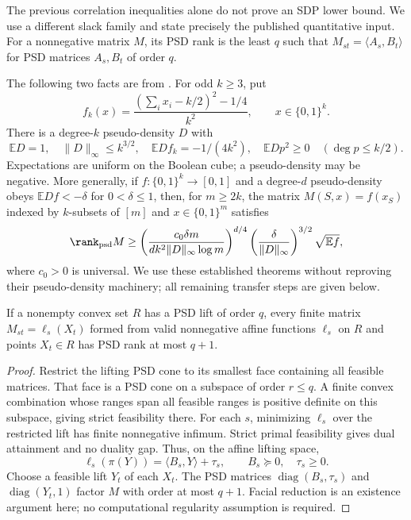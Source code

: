 The previous correlation inequalities alone do not prove an SDP lower
bound. We use a different slack family and state precisely the published
quantitative input. For a nonnegative matrix $M$, its PSD rank is the
least $q$ such that $M_{st}=\langle A_s,B_t\rangle$ for PSD matrices
$A_s,B_t$ of order $q$.

The following two facts are from
\citet[Theorem~5.3 and equation~(3.11), following Theorem~3.8]
{s6:lrs-full}. For odd $k\ge3$, put
\[
 f_k(x)=\frac{(\sum_i x_i-k/2)^2-1/4}{k^2},\qquad x\in\{0,1\}^k.
\]
There is a degree-$k$ pseudo-density $D$ with
\[
 \mathbb ED=1,\quad\|D\|_\infty\le k^{3/2},\quad
 \mathbb E Df_k=-1/(4k^2),\quad
 \mathbb E Dp^2\ge0\quad(\deg p\le k/2).
\]
Expectations are uniform on the Boolean cube; a pseudo-density may be
negative. More generally, if $f:\{0,1\}^k\to[0,1]$ and a degree-$d$
pseudo-density obeys $\mathbb EDf<-\delta$ for $0<\delta\le1$,
then, for $m\ge2k$,
the matrix $M(S,x)=f(x_S)$ indexed by $k$-subsets of $[m]$ and
$x\in\{0,1\}^m$ satisfies
\begin{equation}
 \rank_{\rm psd}M\ge
 \left(\frac{c_0\delta m}{dk^2\|D\|_\infty\log m}\right)^{d/4}
 \left(\frac{\delta}{\|D\|_\infty}\right)^{3/2}
 \sqrt{\mathbb Ef},\label{app:lrs-input}
\end{equation}
where $c_0>0$ is universal. We use these established theorems without
reproving their pseudo-density machinery; all remaining transfer steps
are given below.

\begin{lemma}\label{app:slack-factor}
If a nonempty convex set $R$ has a PSD lift of order $q$, every finite
matrix $M_{st}=\ell_s(X_t)$ formed from valid nonnegative affine
functions $\ell_s$ on $R$ and points $X_t\in R$ has PSD rank at most
$q+1$.
\end{lemma}
\begin{proof}
Restrict the lifting PSD cone to its smallest face containing all feasible
matrices. That face is a PSD cone on a subspace of order $r\le q$.
A finite convex combination whose ranges span all feasible ranges is
positive definite on this subspace, giving strict feasibility there.
For each $s$, minimizing $\ell_s$ over the restricted lift has finite
nonnegative infimum. Strict primal feasibility gives dual attainment
and no duality gap. Thus, on the affine lifting space,
\[
 \ell_s(\pi(Y))=\langle B_s,Y\rangle+\tau_s,
 \qquad B_s\succeq0,\quad\tau_s\ge0.
\]
Choose a feasible lift $Y_t$ of each $X_t$. The PSD matrices
$\operatorname{diag}(B_s,\tau_s)$ and
$\operatorname{diag}(Y_t,1)$ factor $M$ with order at most $q+1$.
Facial reduction is an existence argument here; no computational
regularity assumption is required.
\end{proof}


